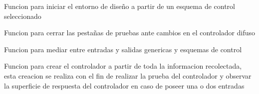 \documentclass[letterpaper,10pt,spanish]{sphinxmanual}
\begin{document}
\begin{fulllineitems}
\label{\detokenize{codigos/FuzzyHandler:FuzzyHandler.cargar_esquema}}
Funcion para iniciar el entorno de diseño a partir de un esquema de control seleccionado

\end{fulllineitems}


\begin{fulllineitems}
\label{\detokenize{codigos/FuzzyHandler:FuzzyHandler.cerrar_prueba}}
Funcion para cerrar las pestañas de pruebas ante cambios en el controlador difuso

\end{fulllineitems}


\begin{fulllineitems}
\label{\detokenize{codigos/FuzzyHandler:FuzzyHandler.check_esquema_show}}
Funcion para mediar entre entradas y salidas genericas y esquemas de control

\end{fulllineitems}


\begin{fulllineitems}
\label{\detokenize{codigos/FuzzyHandler:FuzzyHandler.crear_controlador}}
Funcion para crear el controlador a partir de toda la informacion recolectada, esta creacion se realiza con el fin de realizar la prueba del controlador y observar la superficie de respuesta del controlador en caso de poseer una o dos entradas

\end{fulllineitems}
\end{document}
